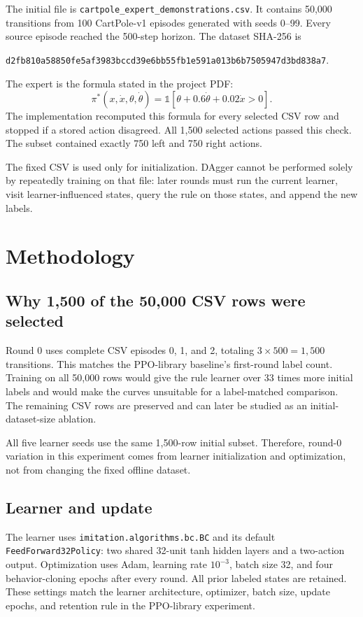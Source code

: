 \documentclass[11pt]{article}
\begin{document}
The initial file is \texttt{cartpole\_expert\_demonstrations.csv}. It contains 50,000 transitions from 100 CartPole-v1 episodes generated with seeds 0--99. Every source episode reached the 500-step horizon. The dataset SHA-256 is
\begin{center}
\small\texttt{d2fb810a58850fe5af3983bccd39e6bb55fb1e591a013b6b7505947d3bd838a7}.
\end{center}

The expert is the formula stated in the project PDF:
\[
\pi^*(x,\dot{x},\theta,\dot{\theta})
=\mathbb{1}\!\left[\theta+0.6\dot{\theta}+0.02\dot{x}>0\right].
\]
The implementation recomputed this formula for every selected CSV row and stopped if a stored action disagreed. All 1,500 selected actions passed this check. The subset contained exactly 750 left and 750 right actions.

The fixed CSV is used only for initialization. DAgger cannot be performed solely by repeatedly training on that file: later rounds must run the current learner, visit learner-influenced states, query the rule on those states, and append the new labels.

\section{Methodology}

\subsection{Why 1,500 of the 50,000 CSV rows were selected}

Round 0 uses complete CSV episodes 0, 1, and 2, totaling $3\times500=1{,}500$ transitions. This matches the PPO-library baseline's first-round label count. Training on all 50,000 rows would give the rule learner over 33 times more initial labels and would make the curves unsuitable for a label-matched comparison. The remaining CSV rows are preserved and can later be studied as an initial-dataset-size ablation.

All five learner seeds use the same 1,500-row initial subset. Therefore, round-0 variation in this experiment comes from learner initialization and optimization, not from changing the fixed offline dataset.

\subsection{Learner and update}

The learner uses \texttt{imitation.algorithms.bc.BC} and its default \texttt{FeedForward32Policy}: two shared 32-unit tanh hidden layers and a two-action output. Optimization uses Adam, learning rate $10^{-3}$, batch size 32, and four behavior-cloning epochs after every round. All prior labeled states are retained. These settings match the learner architecture, optimizer, batch size, update epochs, and retention rule in the PPO-library experiment.
\end{document}
